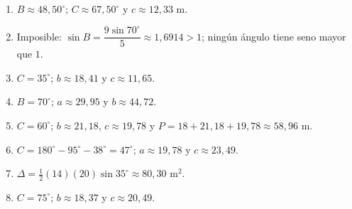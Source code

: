 \documentclass[12pt, letterpaper]{article}
\providecommand{\sen}{\sin}
\begin{document}
\begin{enumerate}[leftmargin=*, label=\textbf{\arabic*.}]
  \item $B\approx 48{,}50^\circ$; $C\approx 67{,}50^\circ$ y $c\approx 12{,}33$ m.
  \item Imposible: $\sen B=\dfrac{9\sen 70^\circ}{5}\approx 1{,}6914>1$; ningún ángulo tiene seno mayor que $1$.
  \item $C=35^\circ$; $b\approx 18{,}41$ y $c\approx 11{,}65$.
  \item $B=70^\circ$; $a\approx 29{,}95$ y $b\approx 44{,}72$.
  \item $C=60^\circ$; $b\approx 21{,}18$, $c\approx 19{,}78$ y $P=18+21{,}18+19{,}78\approx 58{,}96$ m.
  \item $C=180^\circ-95^\circ-38^\circ=47^\circ$; $a\approx 19{,}78$ y $c\approx 23{,}49$.
  \item $\Delta=\tfrac12(14)(20)\sen 35^\circ\approx 80{,}30$ m$^2$.
  \item $C=75^\circ$; $b\approx 18{,}37$ y $c\approx 20{,}49$.
\end{enumerate}
\end{document}

